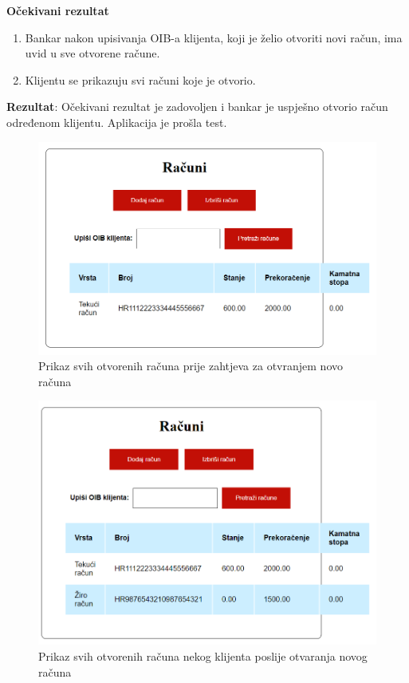 	\textbf{Očekivani rezultat}
	
	\begin{enumerate}
		\item Bankar nakon upisivanja OIB-a klijenta, koji je želio otvoriti novi račun, ima uvid u sve otvorene račune.
		\item Klijentu se prikazuju svi računi koje je otvorio.
	\end{enumerate}
	
	\textbf{Rezultat}: Očekivani rezultat je zadovoljen i bankar je uspješno otvorio račun određenom klijentu. Aplikacija je prošla test.
	
	\begin{figure}[H]
		\includegraphics[scale=0.7]{slike/racuniklijentaprije.PNG}
		\centering
		\caption{Prikaz svih otvorenih računa prije zahtjeva za otvranjem novo računa}
		\label{fig:racprije}
	\end{figure}
	\begin{figure}[H]
		\includegraphics[scale=0.7]{slike/racuniklijentaposlije.PNG}
		\centering
		\caption{Prikaz svih otvorenih računa nekog klijenta poslije otvaranja novog računa}
		\label{fig:racposlije}
	\end{figure}

